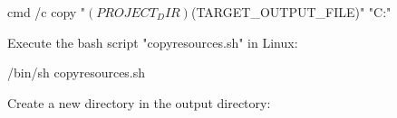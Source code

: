 \begin{code}
cmd /c copy "$(PROJECT_DIR)$(TARGET_OUTPUT_FILE)" "C:\Program\bin"
\end{code}

Execute the bash script "copyresources.sh" in Linux:

\begin{code}
/bin/sh copyresources.sh
\end{code}

Create a new directory in the output directory:

